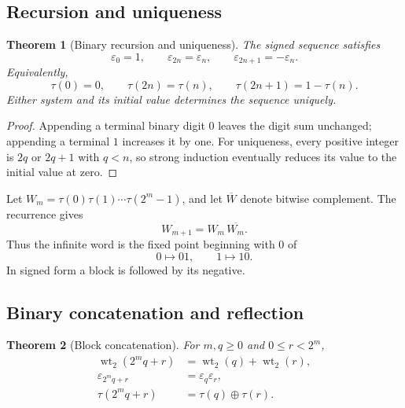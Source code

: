 \documentclass[11pt,oneside]{article}
\numberwithin{equation}{section}
\newtheorem{theorem}{Theorem}[section]
\theoremstyle{definition}
\theoremstyle{remark}
\newcommand{\wt}{\operatorname{wt}_2}
\newcommand{\eps}{\varepsilon}
\newcommand{\xor}{\mathbin{\oplus}}
\begin{document}
\subsection{Recursion and uniqueness}

\begin{theorem}[Binary recursion and uniqueness]
\label{p1:thm:binary-recursion}
The signed sequence satisfies
\begin{equation}
  \eps_0=1,
  \qquad
  \eps_{2n}=\eps_n,
  \qquad
  \eps_{2n+1}=-\eps_n.
  \label{p1:eq:eps-recursion}
\end{equation}
Equivalently,
\begin{equation}
  \tau(0)=0,
  \qquad
  \tau(2n)=\tau(n),
  \qquad
  \tau(2n+1)=1-\tau(n).
  \label{p1:eq:tau-recursion}
\end{equation}
Either system and its initial value determines the sequence uniquely.
\end{theorem}

\begin{proof}
Appending a terminal binary digit \(0\) leaves the digit sum unchanged;
appending a terminal \(1\) increases it by one.  For uniqueness, every positive
integer is \(2q\) or \(2q+1\) with \(q<n\), so strong induction eventually
reduces its value to the initial value at zero.
\end{proof}

Let \(W_m=\tau(0)\tau(1)\cdots\tau(2^m-1)\), and let
\(\overline W\) denote bitwise complement.  The recurrence gives
\begin{equation}
  W_{m+1}=W_m\,\overline{W_m}.
  \label{p1:eq:word-recursion}
\end{equation}
Thus the infinite word is the fixed point beginning with \(0\) of
\begin{equation}
  0\longmapsto01,
  \qquad
  1\longmapsto10.
  \label{p1:eq:thue-morphism}
\end{equation}
In signed form a block is followed by its negative.

\subsection{Binary concatenation and reflection}

\begin{theorem}[Block concatenation]
\label{p1:thm:block-concatenation}
For \(m,q\ge0\) and \(0\le r<2^m\),
\begin{align}
  \wt(2^mq+r)&=\wt(q)+\wt(r),
  \label{p1:eq:block-weight}\\
  \eps_{2^mq+r}&=\eps_q\eps_r,
  \label{p1:eq:block-sign}\\
  \tau(2^mq+r)&=\tau(q)\xor\tau(r).
  \label{p1:eq:block-bit}
\end{align}
\end{theorem}
\end{document}
